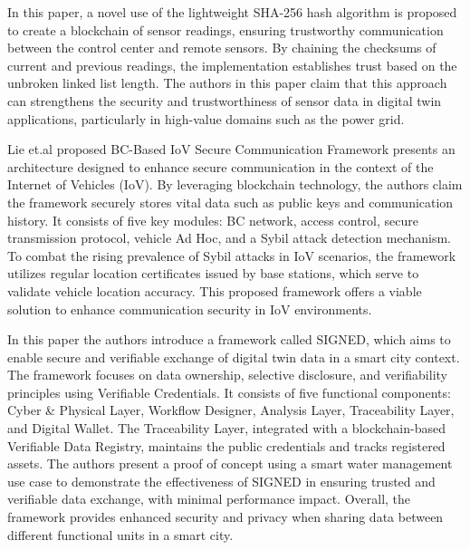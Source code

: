 In \cite{danilczykBlockchainChecksumEstablishing2021a} this paper, a novel use of the lightweight SHA-256 hash algorithm is proposed to create a blockchain of sensor readings, ensuring trustworthy communication between the control center and remote sensors. By chaining the checksums of current and previous readings, the implementation establishes trust based on the unbroken linked list length. The authors in this paper claim that this approach can strengthens the security and trustworthiness of sensor data in digital twin applications, particularly in high-value domains such as the power grid.

Lie et.al \cite{liuBlockchainBasedSecureCommunication2022a} proposed BC-Based IoV Secure Communication Framework presents an architecture designed to enhance secure communication in the context of the Internet of Vehicles (IoV). By leveraging blockchain technology, the authors claim the framework securely stores vital data such as public keys and communication history. It consists of five key modules: BC network, access control, secure transmission protocol, vehicle Ad Hoc, and a Sybil attack detection mechanism. To combat the rising prevalence of Sybil attacks in IoV scenarios, the framework utilizes regular location certificates issued by base stations, which serve to validate vehicle location accuracy. This proposed framework offers a viable solution to enhance communication security in IoV environments.

In \cite{pervezSIGNEDSmartCIty2023a} this paper the authors introduce a framework called SIGNED, which aims to enable secure and verifiable exchange of digital twin data in a smart city context. The framework focuses on data ownership, selective disclosure, and verifiability principles using Verifiable Credentials. It consists of five functional components: Cyber & Physical Layer, Workflow Designer, Analysis Layer, Traceability Layer, and Digital Wallet. The Traceability Layer, integrated with a blockchain-based Verifiable Data Registry, maintains the public credentials and tracks registered assets. The authors present a proof of concept using a smart water management use case to demonstrate the effectiveness of SIGNED in ensuring trusted and verifiable data exchange, with minimal performance impact. Overall, the framework provides enhanced security and privacy when sharing data between different functional units in a smart city.

